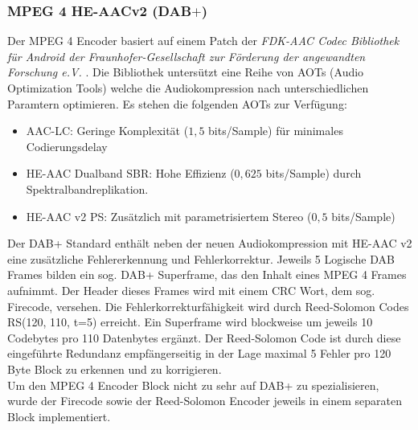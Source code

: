 \subsubsection{MPEG 4 HE-AACv2 (DAB$+$)}
Der MPEG 4 Encoder basiert auf einem Patch der \textit{FDK-AAC Codec Bibliothek für Android der Fraunhofer-Gesellschaft zur Förderung der angewandten Forschung e.V.} \cite{repo:fdk-aac}. Die Bibliothek untersützt eine Reihe von AOTs (Audio Optimization Tools) welche die Audiokompression nach unterschiedlichen Paramtern optimieren. Es stehen die folgenden AOTs zur Verfügung:
\begin{itemize}
\item AAC-LC: Geringe Komplexität ($1,5$ bits/Sample) für minimales Codierungsdelay
\item HE-AAC Dualband SBR: Hohe Effizienz ($0,625$ bits/Sample) durch Spektralbandreplikation.
\item HE-AAC v2 PS: Zusätzlich mit parametrisiertem Stereo ($0,5$ bits/Sample)
\end{itemize}
Der DAB+ Standard enthält neben der neuen Audiokompression mit HE-AAC v2 eine zusätzliche Fehlererkennung und Fehlerkorrektur. Jeweils 5 Logische DAB Frames bilden ein sog. DAB+ Superframe, das den Inhalt eines MPEG 4 Frames aufnimmt. Der Header dieses Frames wird mit einem CRC Wort, dem sog. Firecode, versehen. Die Fehlerkorrekturfähigkeit wird durch Reed-Solomon Codes RS(120, 110, t=5) erreicht. Ein Superframe wird blockweise um jeweils 10 Codebytes pro 110 Datenbytes ergänzt. Der Reed-Solomon Code ist durch diese eingeführte Redundanz empfängerseitig in der Lage maximal 5 Fehler pro 120 Byte Block zu erkennen und zu korrigieren.\\
Um den MPEG 4 Encoder Block nicht zu sehr auf DAB+ zu spezialisieren, wurde der Firecode sowie der Reed-Solomon Encoder jeweils in einem separaten Block implementiert.

